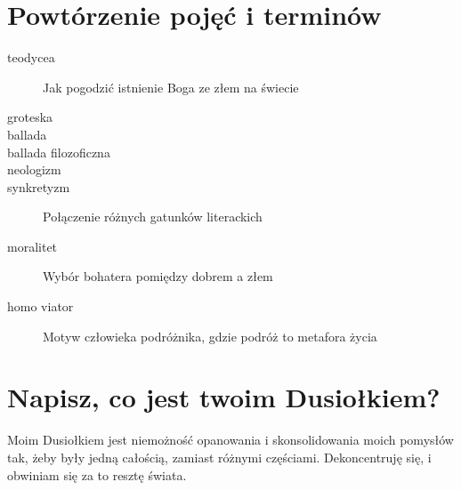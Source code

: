 \documentclass[a4paper]{article}
\begin{document}
\section{Powtórzenie pojęć i terminów}
\begin{description}
    \item[teodycea] Jak pogodzić istnienie Boga ze złem na świecie
    \item[groteska] 
    \item[ballada] 
    \item[ballada filozoficzna] 
    \item[neologizm] 
    \item[synkretyzm] Połączenie różnych gatunków literackich
    \item[moralitet] Wybór bohatera pomiędzy dobrem a złem
    \item[homo viator] Motyw człowieka podróżnika, gdzie podróż to metafora życia
\end{description}
\section{Napisz, co jest twoim Dusiołkiem?}
Moim Dusiołkiem jest niemożność opanowania i skonsolidowania moich pomysłów tak, żeby były jedną całością, zamiast różnymi częściami. Dekoncentruję się, i obwiniam się za to resztę świata.
\end{document}
